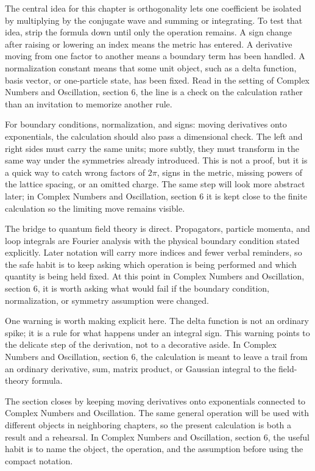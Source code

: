 The central idea for this chapter is orthogonality lets one coefficient be isolated by multiplying by the conjugate wave and summing or integrating.  To test that idea, strip the formula down until only the operation remains.  A sign change after raising or lowering an index means the metric has entered.  A derivative moving from one factor to another means a boundary term has been handled.  A normalization constant means that some unit object, such as a delta function, basis vector, or one-particle state, has been fixed.  Read in the setting of Complex Numbers and Oscillation, section 6, the line is a check on the calculation rather than an invitation to memorize another rule.

For boundary conditions, normalization, and signs: moving derivatives onto exponentials, the calculation should also pass a dimensional check.  The left and right sides must carry the same units; more subtly, they must transform in the same way under the symmetries already introduced.  This is not a proof, but it is a quick way to catch wrong factors of \(2\pi\), signs in the metric, missing powers of the lattice spacing, or an omitted charge.  The same step will look more abstract later; in Complex Numbers and Oscillation, section 6 it is kept close to the finite calculation so the limiting move remains visible.

The bridge to quantum field theory is direct.  Propagators, particle momenta, and loop integrals are Fourier analysis with the physical boundary condition stated explicitly.  Later notation will carry more indices and fewer verbal reminders, so the safe habit is to keep asking which operation is being performed and which quantity is being held fixed.  At this point in Complex Numbers and Oscillation, section 6, it is worth asking what would fail if the boundary condition, normalization, or symmetry assumption were changed.

One warning is worth making explicit here.  The delta function is not an ordinary spike; it is a rule for what happens under an integral sign.  This warning points to the delicate step of the derivation, not to a decorative aside.  In Complex Numbers and Oscillation, section 6, the calculation is meant to leave a trail from an ordinary derivative, sum, matrix product, or Gaussian integral to the field-theory formula.

The section closes by keeping moving derivatives onto exponentials connected to Complex Numbers and Oscillation.  The same general operation will be used with different objects in neighboring chapters, so the present calculation is both a result and a rehearsal.  In Complex Numbers and Oscillation, section 6, the useful habit is to name the object, the operation, and the assumption before using the compact notation.



